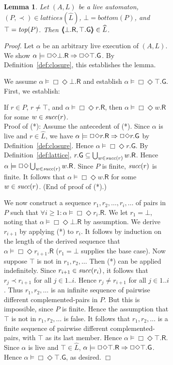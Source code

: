 \documentclass[11pt]{article}
\newcommand{\bl}{\begin{lemma}}
\newcommand{\el}{\end{lemma}}
\newcommand{\bpr}{\begin{proof}}
\newcommand{\epr}{\end{proof}}
\newcommand{\bleqn}[1]{\begin{centlabeqn}{#1}}
\newcommand{\eleqn}{\end{centlabeqn}}
\renewcommand{\ss}{\smallskip}
\newenvironment{centlabeqn}[1]		{\sbox{\EqnLabel}{#1}
    {\ss\\ \hspace*{\fill}}
   } 
   {\hfill{\makebox[0in][r]{\usebox{\EqnLabel}}}\ms\\}
\newcommand{\UN}{\bigcup}
\newcommand{\fa}{\forall}
\newcommand{\sat}{\models}
\newcommand{\G}{\mathsf{G}}
\newcommand{\R}{\mathsf{R}}
\newcommand{\pair}[2]{\lpb #1, #2 \rpb}
\newcommand{\lpb}{\langle \hspace{-0.34em} \langle \hspace{-0.34em} \langle}
\newcommand{\rpb}{\rangle \hspace{-0.34em} \rangle \hspace{-0.34em} \rangle}
\newcommand{\al}{\alpha}
\newcommand{\bottom}{\mathit{bottom}}
\newcommand{\clos}[1]{\widehat{{#1}}}	\newcommand{\esig}{\mathit{esig}}
\newcommand{\lattices}{\mathit{lattices}}
\newcommand{\lprec}{\prec}
\newcommand{\iof}{\Box \Diamond}
\newtheorem{lemma}[theorem]{Lemma}
\newcommand{\ms}[1]{\relax\ifmmode
                \mathord{\mathcode`\-="702D\it #1\mathcode`\-="2200}\else
{\it #1}\fi
}
\newenvironment{proof}{\vspace{-1.0ex}\textit{Proof.} }
                      {\hfill{$\Box$}}
\begin{document}
\begin{figure}[htb]
\begin{figure}[htb]
\bl
Let $(A,L)$ be a live automaton, $(P,\lprec) \in \lattices(\clos{L})$,
$\bot = \bottom(P)$, and $\top = \mathit{top}(P)$. Then 
$\pair{\bot.\R}{\top.\G} \in \clos{L}$.
\label{lem:lattice}
\el
\bpr Let $\alpha$ be an arbitrary live execution of $(A,L)$.
We show $\al \sat \iof \bot.\R \imp \iof \top.\G$.
By Definition~\ref{def:closure}, this establishes the lemma.

We assume $\alpha \sat \iof \bot.\R$ and establish $\alpha \sat \iof \top.\G$.
First, we establish:
\bleqn{(*)}
	If $r \in P$, $r \neq \top$, and $\alpha \sat \iof r.\R$, then
        $\alpha \sat \iof w.\R$
         for some $w \in \mathit{succ}(r)$.
\eleqn
Proof of (*): Assume the antecedent of (*). Since $\alpha$ is live
and $r \in \clos{L}$, we have
$\alpha \sat \iof r.\R \imp \iof r.\G$ by Definition~\ref{def:closure}.
Hence $\alpha \sat \iof r.\G$.
By Definition~\ref{def:lattice}, $r.\G \subseteq \UN_{w \in \suc(r)} w.\R$.
Hence $\alpha \sat \iof \UN_{w \in \suc(r)} w.\R$. Since $P$
is finite, $\mathit{succ}(r)$ is finite. It follows that 
$\alpha \sat \iof w.\R$ for some $w \in \mathit{succ}(r)$.
(End of proof of (*).)

We now construct a sequence $r_1, r_2, \ldots, r_i, \ldots$ of pairs in $P$ such
that $\fa i \geq 1: \alpha \sat \iof r_i.\R$.  We let $r_1 = \bot$, noting
that $\alpha \sat \iof \bot.\R$ by assumption.  We derive $r_{i+1}$ by applying
(*) to $r_i$. It follows by induction on the length of the derived sequence that 
$\alpha \sat \iof r_{i+1}.\R$ ($r_1 = \bot$ supplies the base case).
Now suppose $\top$ is not in $r_1, r_2, \ldots$  Then (*) can be
applied indefinitely. Since $r_{i+1} \in \mathit{succ}(r_i)$, it follows that 
$r_j \lprec r_{i+1}$ for all $j \in 1..i$. Hence $r_j \neq r_{i+1}$ for all $j \in 1..i$.
Thus $r_1, r_2, \ldots$ is an infinite sequence of pairwise different
complemented-pairs in
$P$. But this is impossible, since $P$ is finite. Hence the assumption that
$\top$ is not in $r_1, r_2, \ldots$ is false. It follows that 
$r_1, r_2, \ldots$ is a finite sequence of 
pairwise different complemented-pairs, with $\top$ as its last member. 
Hence 
$\alpha \sat \iof \top.\R$. Since $\alpha$ is live and $\top \in \clos{L}$,
$\alpha \sat \iof \top.\R \imp \iof \top.\G$. Hence $\alpha \sat \iof \top.\G$,
as desired.
\epr


\vspace{1.0ex}



\end{figure}
\end{figure}
\end{document}
